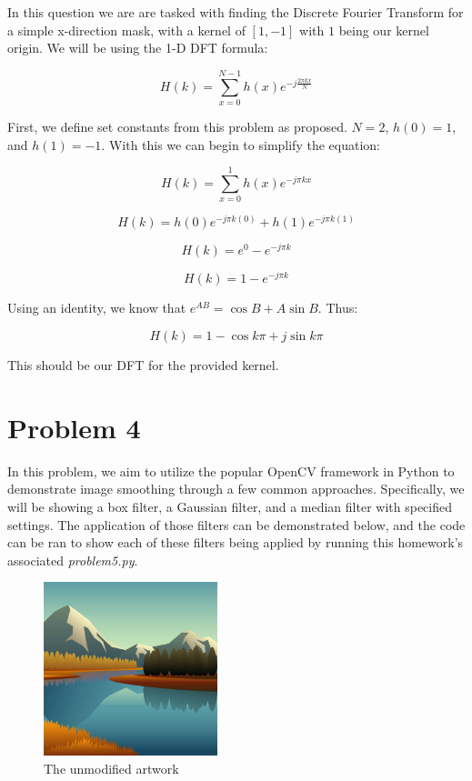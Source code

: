 \documentclass{article}
\begin{document}
In this question we are are tasked with finding the Discrete Fourier Transform for a simple x-direction mask, with a kernel of $[1, -1]$ with $1$ being our kernel origin. We will be using the 1-D DFT formula:

\begin{equation}
    H(k) = \sum^{N-1}_{x=0} h(x)e^{-j\frac{2\pi k x}{N}}
\end{equation}

First, we define set constants from this problem as proposed. $N=2$, $h(0)=1$, and $h(1) = -1$. With this we can begin to simplify the equation:

\begin{equation}
    H(k) = \sum^{1}_{x=0} h(x)e^{-j \pi k x}
\end{equation}

\begin{equation}
    H(k) = h(0)e^{-j \pi k (0)} + h(1)e^{-j \pi k (1)}
\end{equation}

\begin{equation}
    H(k) = e ^ 0 - e^{-j\pi k}
\end{equation}

\begin{equation}
    H(k) = 1 - e^{-j \pi k}
\end{equation}

Using an identity, we know that $e^{AB} = \cos{B} + A\sin{B}$. Thus:

\begin{equation}
    H(k) = 1 - \cos{k\pi} + j \sin{k\pi}
\end{equation}

This should be our DFT for the provided kernel.

\section*{Problem 4}

In this problem, we aim to utilize the popular OpenCV framework in Python to demonstrate image smoothing through a few common approaches. Specifically, we will be showing a box filter, a Gaussian filter, and a median filter with specified settings. The application of those filters can be demonstrated below, and the code can be ran to show each of these filters being applied by running this homework's associated \textit{problem5.py}.

\begin{figure}[H]
    \centering
    \includegraphics[width = 0.45\textwidth]{imgs/artwork.jpg}
    \caption{The unmodified artwork}
    \label{fig:base_image}
\end{figure}
\end{document}
